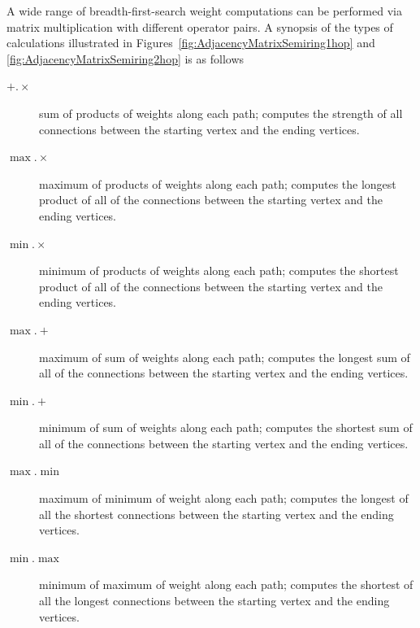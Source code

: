   A wide range of breadth-first-search weight computations can be performed via matrix multiplication with different operator pairs.  A synopsis of the types of calculations illustrated in Figures~\ref{fig:AdjacencyMatrixSemiring1hop} and \ref{fig:AdjacencyMatrixSemiring2hop} is as follows
\begin{description}
\item[${+}.{\times}$] sum of products of weights along each path; computes the strength of all connections between the starting vertex and the ending vertices.
\item[${\max}.{\times}$] maximum of products of weights along each path; computes the longest product of all of the connections between the starting vertex and the ending vertices.
\item[${\min}.{\times}$] minimum of products of weights along each path; computes the shortest product of all of the connections between the starting vertex and the ending vertices.
\item[${\max}.{+}$] maximum of sum of weights along each path; computes the longest sum of all of the connections between the starting vertex and the ending vertices.
\item[${\min}.{+}$] minimum of sum of weights along each path; computes the shortest sum of all of the connections between the starting vertex and the ending vertices.
\item[${\max}.{\min}$] maximum of minimum of weight along each path; computes the longest of all the shortest connections between the starting vertex and the ending vertices.
\item[${\min}.{\max}$] minimum of maximum of weight along each path; computes the shortest of all the longest connections between the starting vertex and the ending vertices.
\end{description}

